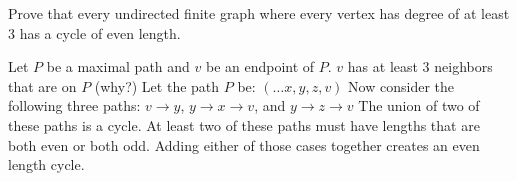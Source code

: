 \question Prove that every undirected finite graph where every vertex 
has degree of at least $3$ has a cycle of even length.

\begin{solution}[1 in]
Let $P$ be a maximal path and $v$ be an endpoint of $P$.
$v$ has at least 3 neighbors that are on $P$ (why?)
Let the path $P$ be: $(\dotsc x, y, z, v)$
Now consider the following three paths: $v \rightarrow y$, $y 
\rightarrow x \rightarrow v$, and $y \rightarrow z \rightarrow v$
The union of two of these paths is a cycle.
At least two of these paths must have lengths that are both even or 
both odd. Adding either of those cases together creates an even length cycle.
\end{solution}